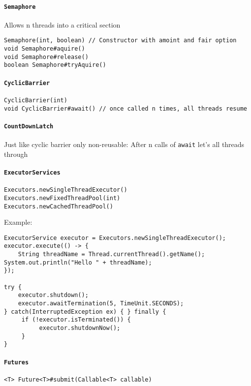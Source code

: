 \paragraph{\texttt{Semaphore}}
Allows n threads into a critical section
\begin{verbatim}
Semaphore(int, boolean) // Constructor with amoint and fair option
void Semaphore#aquire()
void Semaphore#release()
boolean Semaphore#tryAquire()
\end{verbatim}
\paragraph{\texttt{CyclicBarrier}}
\begin{verbatim}
CyclicBarrier(int)
void CyclicBarrier#await() // once called n times, all threads resume
\end{verbatim}
\paragraph{\texttt{CountDownLatch}}
Just like cyclic barrier only non-reusable: After n calls of \texttt{await} let's all threads through

\paragraph{\texttt{ExecutorServices}}
\begin{verbatim}
Executors.newSingleThreadExecutor()
Executors.newFixedThreadPool(int)
Executors.newCachedThreadPool()
\end{verbatim}
Example:
\begin{verbatim}
ExecutorService executor = Executors.newSingleThreadExecutor(); executor.execute(() -> {
    String threadName = Thread.currentThread().getName(); System.out.println("Hello " + threadName);
});

try {
    executor.shutdown();
    executor.awaitTermination(5, TimeUnit.SECONDS);
} catch(InterruptedException ex) { } finally {
     if (!executor.isTerminated()) {
          executor.shutdownNow();
     } 
}
\end{verbatim}
\paragraph{\texttt{Futures}}
\begin{verbatim}
<T> Future<T>#submit(Callable<T> callable)
\end{verbatim}
 
